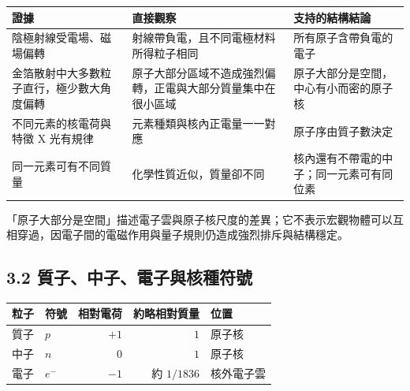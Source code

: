 \documentclass[11pt,a4paper]{article}
\newcounter{none}
\begin{document}
{\def\LTcaptype{none} %
\begin{longtable}[]{@{}
  >{\raggedright\arraybackslash}p{}
  >{\raggedright\arraybackslash}p{}
  >{\raggedright\arraybackslash}p{}@{}}
\toprule\noalign{}
\begin{minipage}[b]{\linewidth}\raggedright
證據
\end{minipage} & \begin{minipage}[b]{\linewidth}\raggedright
直接觀察
\end{minipage} & \begin{minipage}[b]{\linewidth}\raggedright
支持的結構結論
\end{minipage} \\
\midrule\noalign{}
\endhead
\bottomrule\noalign{}
\endlastfoot
陰極射線受電場、磁場偏轉 & 射線帶負電，且不同電極材料所得粒子相同 & 所有原子含帶負電的電子 \\
金箔散射中大多數粒子直行，極少數大角度偏轉 & 原子大部分區域不造成強烈偏轉，正電與大部分質量集中在很小區域 & 原子大部分是空間，中心有小而密的原子核 \\
不同元素的核電荷與特徵 X 光有規律 & 元素種類與核內正電量一一對應 & 原子序由質子數決定 \\
同一元素可有不同質量 & 化學性質近似，質量卻不同 & 核內還有不帶電的中子；同一元素可有同位素 \\
\end{longtable}
}

「原子大部分是空間」描述電子雲與原子核尺度的差異；它不表示宏觀物體可以互相穿過，因電子間的電磁作用與量子規則仍造成強烈排斥與結構穩定。

\subsection{3.2 質子、中子、電子與核種符號}\label{ux8ceaux5b50ux4e2dux5b50ux96fbux5b50ux8207ux6838ux7a2eux7b26ux865f}

{\def\LTcaptype{none} %
\begin{longtable}[]{@{}llrrl@{}}
\toprule\noalign{}
粒子 & 符號 & 相對電荷 & 約略相對質量 & 位置 \\
\midrule\noalign{}
\endhead
\bottomrule\noalign{}
\endlastfoot
質子 & \(p\) & \(+1\) & \(1\) & 原子核 \\
中子 & \(n\) & \(0\) & \(1\) & 原子核 \\
電子 & \(e^-\) & \(-1\) & 約 \(1/1836\) & 核外電子雲 \\
\end{longtable}
}
\end{document}
